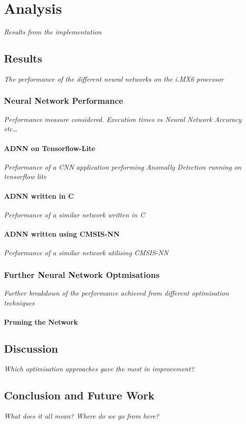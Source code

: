 \part{Analysis}
\textit{Results from the implementation}

\chapter{Results}
\textit{The performance of the different neural networks on the i.MX6 processor}

\section{Neural Network Performance}
\textit{Performance measure considered. Execution times vs Neural Network Accuracy etc\dots}

\subsection{ADNN on Tensorflow-Lite}
\textit{Performance of a CNN application performing Anomally Detection running on tensorflow lite}

\subsection{ADNN written in C}
\textit{Performance of a similar network written in C}

\subsection{ADNN written using CMSIS-NN}
\textit{Performance of a similar network utilising CMSIS-NN}

\section{Further Neural Network Optmisations}
\textit{Further breakdown of the performance achieved from different optimisation techniques}

\subsection{Pruning the Network}

\chapter{Discussion}
\textit{Which optimisation approaches gave the most in improvement?}

\chapter{Conclusion and Future Work}
\textit{What does it all mean? Where do we go from here?}
